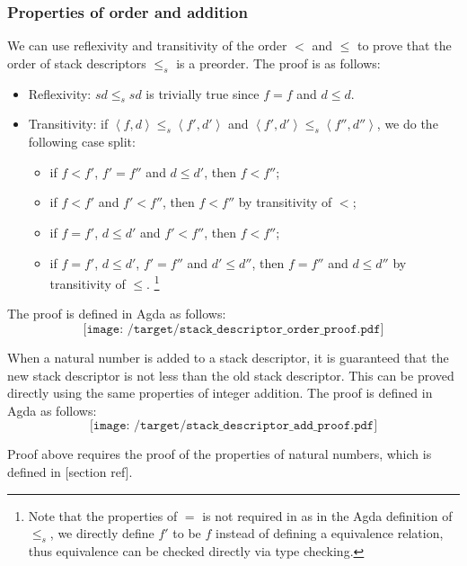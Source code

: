 \documentclass[12pt,twoside,a4paper]{report}
\theoremstyle{definition}
\theoremstyle{definition}
\theoremstyle{definition}
\theoremstyle{definition}
\newcommand{\ang}[1]{\left\langle #1 \right\rangle}
\begin{document}
    \subsubsection{Properties of order and addition}
    We can use reflexivity and transitivity of the order $<$ and $\leq$ to prove that the order of stack descriptors $\leq_s$ is a preorder. The proof is as follows:
    \begin{itemize}
        \item 
            Reflexivity: $sd \leq_s sd$ is trivially true since $f = f$ and $d \leq d$.
        \item
            Transitivity: if $\ang{f, d} \leq_s \ang{f', d'}$ and $\ang{f', d'} \leq_s \ang{f'', d''}$, we do the following case split:
            \begin{itemize}
                \item 
                    if $f < f'$, $f' = f''$ and $d \leq d'$, then $f < f''$; 
                \item 
                    if $f < f'$ and $f' < f''$, then $f < f''$ by transitivity of $<$;
                \item
                    if $f = f'$, $d \leq d'$ and $f' < f''$, then $f < f''$;
                \item
                    if $f = f'$, $d \leq d'$, $f' = f''$ and $d' \leq d''$, then $f = f''$ and $d \leq d''$ by transitivity of $\leq$. \footnote{Note that the properties of $=$ is not required in as in the Agda definition of $\leq_s$, we directly define $f'$ to be $f$ instead of defining a equivalence relation, thus equivalence can be checked directly via type checking.}
            \end{itemize}
    \end{itemize}
    The proof is defined in Agda as follows:
    \[\texttt{[image: /target/stack\_descriptor\_order\_proof.pdf]}\]

    When a natural number is added to a stack descriptor, it is guaranteed that the new stack descriptor is not less than the old stack descriptor. This can be proved directly using the same properties of integer addition. The proof is defined in Agda as follows:
    \[\texttt{[image: /target/stack\_descriptor\_add\_proof.pdf]}\]

    Proof above requires the proof of the properties of natural numbers, which is defined in [section ref].
    
\end{document}
